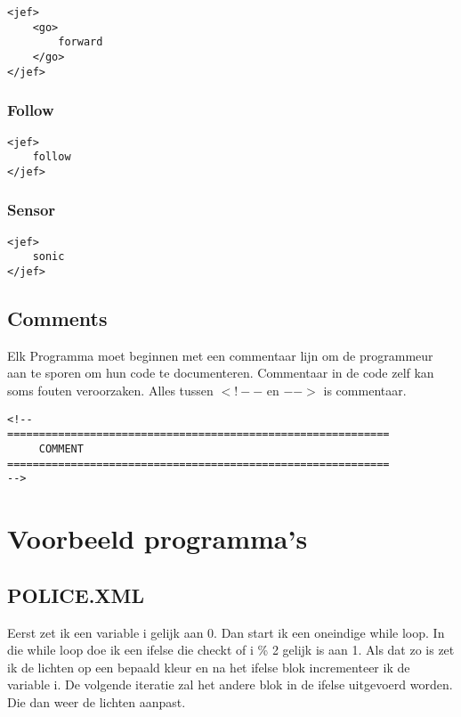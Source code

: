 \documentclass[]{article}
\begin{document}
\begin{lstlisting}
<jef>
    <go>
        forward
    </go>
</jef>
\end{lstlisting}

\subsubsection{Follow}

\begin{lstlisting}
<jef>
    follow
</jef>
\end{lstlisting}

\subsubsection{Sensor}

\begin{lstlisting}
<jef>
    sonic
</jef>
\end{lstlisting}

\-

\subsection{Comments}
Elk Programma moet beginnen met een commentaar lijn om de programmeur aan te sporen om hun code te documenteren. Commentaar in de code zelf kan soms fouten veroorzaken. Alles tussen $<!--$ en $ -->$ is commentaar.

\-

\begin{lstlisting}
<!--
============================================================
     COMMENT
============================================================
-->
\end{lstlisting}



\newpage

\section{Voorbeeld programma's}
 \subsection{POLICE.XML}
Eerst zet ik een variable i gelijk aan 0. Dan start ik een oneindige while loop. In die while loop doe ik een ifelse die checkt of i \% 2 gelijk is aan 1. Als dat zo is zet ik de lichten op een bepaald kleur en na het ifelse blok incrementeer ik de variable i. De volgende iteratie zal het andere blok in de ifelse uitgevoerd worden. Die dan weer de lichten aanpast.
\end{document}
